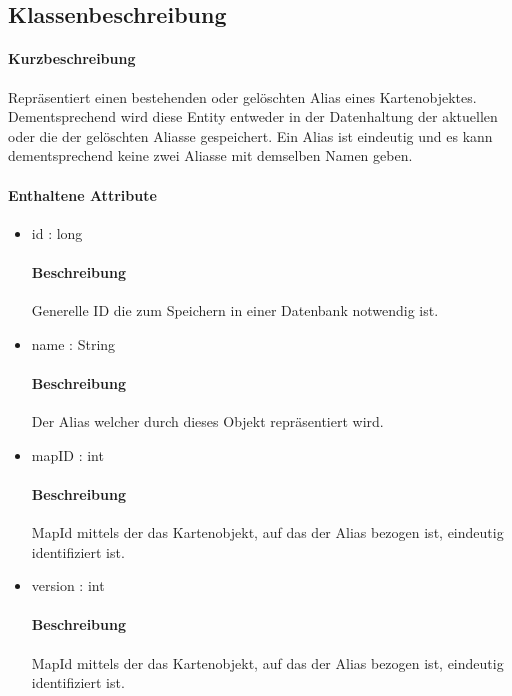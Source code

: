 \subsection{Klassenbeschreibung}%
\paragraph*{Kurzbeschreibung}
    Repräsentiert einen bestehenden oder gelöschten Alias eines Kartenobjektes. Dementsprechend wird diese Entity entweder
    in der Datenhaltung der aktuellen oder die der gelöschten Aliasse gespeichert. Ein Alias ist eindeutig und es kann dementsprechend
    keine zwei Aliasse mit demselben Namen geben.
\paragraph*{Enthaltene Attribute}
\begin{itemize}
    \item id : long
    		\paragraph*{Beschreibung}
            Generelle ID die zum Speichern in einer Datenbank notwendig ist.
    \item name : String
            \paragraph{Beschreibung}
            Der Alias welcher durch dieses Objekt repräsentiert wird.
    \item mapID : int
            \paragraph{Beschreibung}               
            MapId mittels der das Kartenobjekt, auf das der Alias bezogen ist, eindeutig identifiziert ist.
    \item version : int
            \paragraph{Beschreibung}               
            MapId mittels der das Kartenobjekt, auf das der Alias bezogen ist, eindeutig identifiziert ist.   
\end{itemize}            